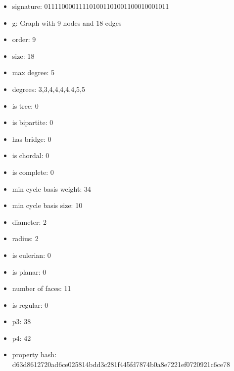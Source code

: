 \newpage
\begin{figure}
\end{figure}
\begin{itemize}
\item signature: 011110000111101001101001100010001011
\item g: Graph with 9 nodes and 18 edges
\item order: 9
\item size: 18
\item max degree: 5
\item degrees: 3,3,4,4,4,4,4,5,5
\item is tree: 0
\item is bipartite: 0
\item has bridge: 0
\item is chordal: 0
\item is complete: 0
\item min cycle basis weight: 34
\item min cycle basis size: 10
\item diameter: 2
\item radius: 2
\item is eulerian: 0
\item is planar: 0
\item number of faces: 11
\item is regular: 0
\item p3: 38
\item p4: 42
\item property hash: d63d8612720ad6ce025814bdd3c281f445fd7874b0a8e7221ef0720921c6ce78
\end{itemize}
